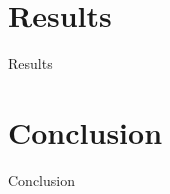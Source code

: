 \section{Results}
\begin{frame}{Results}{}
    
\end{frame}

\section{Conclusion}
\begin{frame}{Conclusion}{}
    
\end{frame}